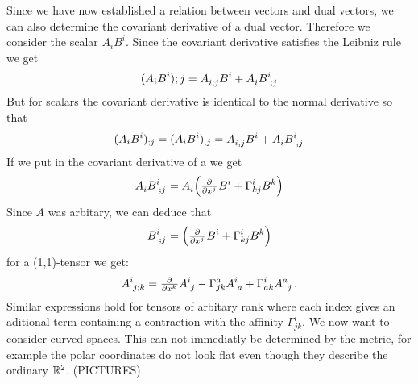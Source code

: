 Since we have now established a relation between vectors and dual vectors, we
can also determine the covariant derivative of a dual vector. Therefore we
consider the scalar $A_iB^i$. Since the covariant derivative satisfies the
Leibniz rule we get
\begin{align}
(A_iB^i);j = \tensor{A}{_i_;_j}\tensor{B}{^i}+\tensor{A}{_i}\tensor{B}{^i_;_j}
\end{align}
But for scalars the covariant derivative is identical to the normal derivative
so that 
\begin{align}
(A_iB^i)_{;j} =(A_iB^i)_{,j}=
\tensor{A}{_i_,_j}\tensor{B}{^i}+\tensor{A}{_i}\tensor{B}{^i_,_j}
\end{align}
If we put in the covariant derivative of a we get 
\begin{equation}
\tensor{A}{_i}\tensor{B}{^i_;_j}=\tensor{A}{_i}\left(\pd{}{{x^j}}B^i+\Gamma^i_{kj}\tensor{B}{^k}\right)
\end{equation}
Since $A$ was arbitary, we can deduce that
\begin{equation}
\tensor{B}{^i_;_j}=\left(\pd{}{{x^j}}B^i+\Gamma^i_{kj}\tensor{B}{^k}\right)
\end{equation}
for a (1,1)-tensor we get:
\begin{equation}
\tensor{A}{^i_j_;_k}=\pd{}{{x^k}}\tensor{A}{^i_j}-\Gamma^a_{jk}\tensor{A}{^i_a}+\Gamma^i_{ak}\tensor{A}{^a_j}\,
.\end{equation}
Similar expressions hold for tensors of arbitary rank where each index gives an
aditional term containing a contraction with the affinity $\Gamma^i_{jk}$. 
We now want to consider curved spaces. This can not immediatly be determined by
the metric, for example the polar coordinates do not look flat even though they
describe the ordinary $\mathbb{R}^2$. (PICTURES)
